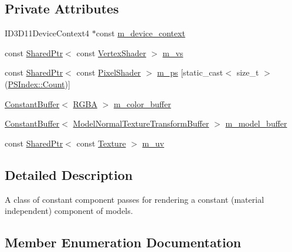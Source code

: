 \subsection*{Private Attributes}
\begin{DoxyCompactItemize}
\item 
I\+D3\+D11\+Device\+Context4 $\ast$const \hyperlink{classmage_1_1_constant_component_pass_a1d4bf6c730c94397219de2a447d1f368}{m\+\_\+device\+\_\+context}
\item 
const \hyperlink{namespacemage_a1e01ae66713838a7a67d30e44c67703e}{Shared\+Ptr}$<$ const \hyperlink{classmage_1_1_vertex_shader}{Vertex\+Shader} $>$ \hyperlink{classmage_1_1_constant_component_pass_aec78ab8193d28847ad591947f03f6515}{m\+\_\+vs}
\item 
const \hyperlink{namespacemage_a1e01ae66713838a7a67d30e44c67703e}{Shared\+Ptr}$<$ const \hyperlink{namespacemage_a27ecaf266420ee7a494d64edc0757129}{Pixel\+Shader} $>$ \hyperlink{classmage_1_1_constant_component_pass_a932366be8feba629aa2dd29a844e38b8}{m\+\_\+ps} \mbox{[}static\+\_\+cast$<$ size\+\_\+t $>$(\hyperlink{classmage_1_1_constant_component_pass_a5700234587f2aa0ebdb4f7790704f00bae93f994f01c537c4e2f7d8528c3eb5e9}{P\+S\+Index\+::\+Count})\mbox{]}
\item 
\hyperlink{structmage_1_1_constant_buffer}{Constant\+Buffer}$<$ \hyperlink{structmage_1_1_r_g_b_a}{R\+G\+BA} $>$ \hyperlink{classmage_1_1_constant_component_pass_a0dce8281280284768371542d88c17eee}{m\+\_\+color\+\_\+buffer}
\item 
\hyperlink{structmage_1_1_constant_buffer}{Constant\+Buffer}$<$ \hyperlink{structmage_1_1_model_normal_texture_transform_buffer}{Model\+Normal\+Texture\+Transform\+Buffer} $>$ \hyperlink{classmage_1_1_constant_component_pass_a012197b5473955c356d2fbc48f9d3e8b}{m\+\_\+model\+\_\+buffer}
\item 
const \hyperlink{namespacemage_a1e01ae66713838a7a67d30e44c67703e}{Shared\+Ptr}$<$ const \hyperlink{classmage_1_1_texture}{Texture} $>$ \hyperlink{classmage_1_1_constant_component_pass_ad69f0d02de95b9125651b447cd8fd884}{m\+\_\+uv}
\end{DoxyCompactItemize}


\subsection{Detailed Description}
A class of constant component passes for rendering a constant (material independent) component of models. 

\subsection{Member Enumeration Documentation}
\hypertarget{classmage_1_1_constant_component_pass_a5700234587f2aa0ebdb4f7790704f00b}{}\label{classmage_1_1_constant_component_pass_a5700234587f2aa0ebdb4f7790704f00b} 
